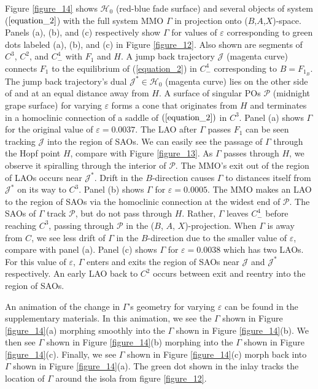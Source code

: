 \documentclass{ws-ijbc}
\begin{document}
Figure \ref{figure_14} shows $\mathscr{H}_0$ (red-blue fade surface) and several objects of system ($\ref{equation_2}$) with the full system MMO $\Gamma$ in projection onto ($B$,$A$,$X$)-space.  Panels (a), (b), and (c) respectively show $\Gamma$ for values of $\varepsilon$ corresponding to green dots labeled (a), (b), and (c) in Figure \ref{figure_12}.  Also shown are segments of $C^3$, $C^2$, and $C^4_-$ with $F_1$ and $H$.  A jump back trajectory $\mathscr{J}$ (magenta curve) connects $F_1$ to the equilibrium of (\ref{equation_2}) in $C^4_-$ corresponding to $B=F_{1_B}$.  The jump back trajectory's dual $\mathscr{J}^* \in \mathscr{H}_0$ (magenta curve) lies on the other side of and at an equal distance away from $H$.  A surface of singular POs $\mathscr{P}$ (midnight grape surface) for varying $\varepsilon$ forms a cone that originates from $H$ and terminates in a homoclinic connection of a saddle of $(\ref{equation_2})$ in $C^3$.  Panel (a) shows $\Gamma$ for the original value of $\varepsilon=0.0037$.  The LAO after $\Gamma$ passes $F_1$ can be seen tracking $\mathscr{J}$ into the region of SAOs.  We can easily see the passage of $\Gamma$ through the Hopf point $H$, compare with Figure \ref{figure_13}.  As $\Gamma$ passes through $H$, we observe it spiralling through the interior of $\mathscr{P}$.  The MMO's exit out of the region of LAOs occurs near $\mathscr{J}^*$. Drift in the $B$-direction causes $\Gamma$ to distances itself from $\mathscr{J}^*$ on its way to $C^3$.  Panel (b) shows $\Gamma$ for $\varepsilon=0.0005$.  The MMO makes an LAO to the region of SAOs via the homoclinic connection at the widest end of $\mathscr{P}$.  The SAOs of $\Gamma$ track $\mathscr{P}$, but do not pass through $H$.  Rather, $\Gamma$ leaves $C^4_-$ before reaching $C^3$, passing through $\mathscr{P}$ in the ($B$, $A$, $X$)-projection.  When $\Gamma$ is away from $C$, we see less drift of $\Gamma$ in the $B$-direction due to the smaller value of $\varepsilon$, compare with panel (a).  Panel (c) shows $\Gamma$ for $\varepsilon=0.0038$ which has two LAOs.  For this value of $\varepsilon$, $\Gamma$ enters and exits the region of SAOs near $\mathscr{J}$ and $\mathscr{J}^*$ respectively.  An early LAO back to $C^2$ occurs between exit and reentry into the region of SAOs.

An animation of the change in $\Gamma$'s geometry for varying $\varepsilon$ can be found in the supplementary materials.  In this animation, we see the $\Gamma$ shown in Figure \ref{figure_14}(a) morphing smoothly into the $\Gamma$ shown in Figure \ref{figure_14}(b).  We then see $\Gamma$ shown in Figure \ref{figure_14}(b) morphing into the $\Gamma$ shown in Figure \ref{figure_14}(c).  Finally, we see $\Gamma$ shown in Figure \ref{figure_14}(c) morph back into $\Gamma$ shown in Figure \ref{figure_14}(a).  The green dot shown in the inlay tracks the location of $\Gamma$ around the isola from figure \ref{figure_12}.
\end{document}
